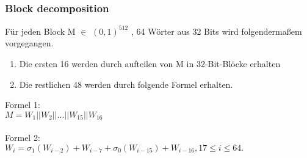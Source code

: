 {\subsubsection{Block decomposition}
\label{sec:hash_block_deco}
Für jeden Block M $\in$ $(0, 1)^{512}$ , 64 Wörter aus 32 Bits wird folgendermaßem vorgegangen. 
\begin{enumerate}
\item Die ersten 16 werden durch aufteilen von M in 32-Bit-Blöcke erhalten
\item Die restlichen 48 werden durch folgende Formel erhalten.
\end{enumerate}
Formel 1:
\\
$M = W_1 || W_2 || ... || W_{15} || W_{16}$\\ \\
Formel 2:\\
$W_i = \sigma_1(W_{i-2}) + W_{i-7} + \sigma_0(W_{i-15}) + W_{i-16},
17 \leq  i \leq  64.$\\
}

